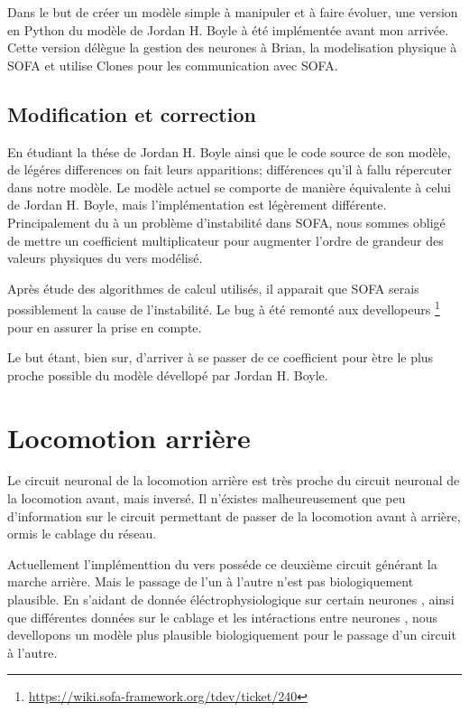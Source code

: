 Dans le but de créer un modèle simple à manipuler et à faire évoluer, une version en Python du
modèle de Jordan H. Boyle à été implémentée avant mon arrivée. Cette version délègue la gestion
des neurones à Brian, la modelisation physique à SOFA et utilise Clones pour les communication
avec SOFA.

\subsection{Modification et correction} %
\label{sub:Modification et correction}

En étudiant la thése de Jordan H. Boyle ainsi que le code source de son modèle, de légéres differences
on fait leurs apparitions; différences qu'il à fallu répercuter dans notre modèle.
Le modèle actuel se comporte de manière équivalente à celui de Jordan H. Boyle, mais l'implémentation
est légèrement différente. Principalement du à un problème d'instabilité dans SOFA, nous sommes obligé
de mettre un coefficient multiplicateur pour augmenter l'ordre de grandeur des valeurs physiques du vers
modélisé.

Après étude des algorithmes de calcul utilisés, il apparait que SOFA serais possiblement la cause de
l'instabilité. Le bug à été remonté aux devellopeurs
\footnote{\url{https://wiki.sofa-framework.org/tdev/ticket/240}} pour en assurer la prise en compte.

Le but étant, bien sur, d'arriver à se passer de ce coefficient pour ètre le plus proche possible
du modèle dévellopé par Jordan H. Boyle.



\section{Locomotion arrière} %
\label{sec:Locomotion arrière}

Le circuit neuronal de la locomotion arrière est très proche du circuit neuronal de la locomotion
avant, mais inversé\cite{Boyle2009}. Il n'éxistes malheureusement que peu d'information sur le circuit
permettant de passer de la locomotion avant à arrière, ormis le cablage du réseau.

Actuellement l'implémenttion du vers posséde ce deuxième circuit générant la marche arrière. Mais
le passage de l'un à l'autre n'est pas biologiquement plausible. En s'aidant de donnée
éléctrophysiologique sur certain neurones \cite{Mellem2008a,Lockery2009}, ainsi que différentes
données sur le cablage et les intéractions entre neurones
\cite{Chalfie1985,Gray2005,Chen2006,Varshney2011,Leifer2011}, nous devellopons un modèle plus
plausible biologiquement pour le passage d'un circuit à l'autre.

